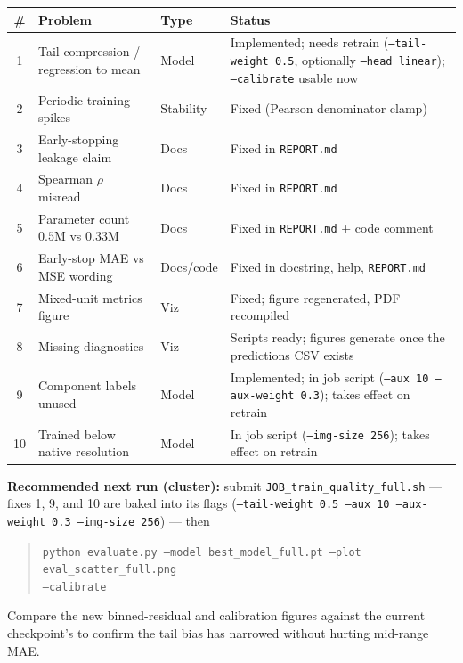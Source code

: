 \documentclass[12pt, letterpaper]{article}
\newcommand{\code}[1]{\texttt{#1}}
\begin{document}
\begin{table}[h!]
\centering
\small
\begin{tabularx}{\textwidth}{@{}c L{0.30\textwidth} l Y@{}}
\toprule
\# & Problem & Type & Status \\
 & Tail compression / regression to mean & Model & Implemented; needs retrain
    (\code{--tail-weight 0.5}, optionally \code{--head linear});
    \code{--calibrate} usable now \\
2 & Periodic training spikes & Stability & Fixed (Pearson denominator clamp) \\
3 & Early-stopping leakage claim & Docs & Fixed in \code{REPORT.md} \\
4 & Spearman $\rho$ misread & Docs & Fixed in \code{REPORT.md} \\
5 & Parameter count $0.5$M vs $0.33$M & Docs & Fixed in \code{REPORT.md} + code comment \\
6 & Early-stop MAE vs MSE wording & Docs/code & Fixed in docstring, help, \code{REPORT.md} \\
7 & Mixed-unit metrics figure & Viz & Fixed; figure regenerated, PDF recompiled \\
8 & Missing diagnostics & Viz & Scripts ready; figures generate once the
    predictions CSV exists \\
9 & Component labels unused & Model & Implemented; in job script
    (\code{--aux 10 --aux-weight 0.3}); takes effect on retrain \\
10 & Trained below native resolution & Model & In job script
    (\code{--img-size 256}); takes effect on retrain \\
\bottomrule
\end{tabularx}
\end{table}

\vspace{6pt}
\textbf{Recommended next run (cluster):} submit \code{JOB\_train\_quality\_full.sh}
--- fixes 1, 9, and 10 are baked into its flags
(\code{--tail-weight 0.5 --aux 10 --aux-weight 0.3 --img-size 256}) --- then
\begin{quote}
\small
\code{python evaluate.py --model best\_model\_full.pt --plot eval\_scatter\_full.png}\\
\code{\hspace*{2em}--calibrate}
\end{quote}
Compare the new binned-residual and calibration figures against the current checkpoint's
to confirm the tail bias has narrowed without hurting mid-range MAE.
\end{document}
